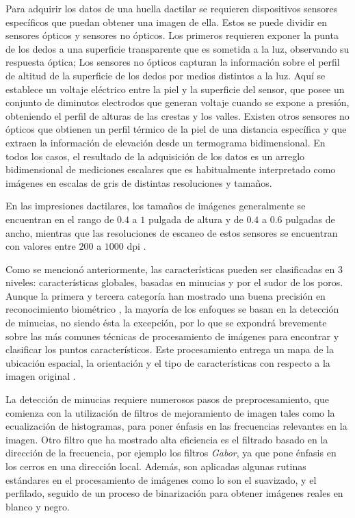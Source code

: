 Para adquirir los datos de una huella dactilar se requieren dispositivos sensores específicos que puedan obtener una imagen de ella. Estos se puede dividir en sensores ópticos y sensores no ópticos. Los primeros requieren exponer la punta de los dedos a una superficie transparente que es sometida a la luz, observando su respuesta óptica; Los sensores no ópticos capturan la información sobre el perfil de altitud de la superficie de los dedos por medios distintos a la luz. Aquí se establece un voltaje eléctrico entre la piel y la superficie del sensor, que posee un conjunto de diminutos electrodos que generan voltaje cuando se expone a presión, obteniendo el perfil de alturas de las crestas y los valles. Existen otros sensores no ópticos que obtienen un perfil térmico de la piel de una distancia específica y que extraen la información de elevación desde un termograma bidimensional. En todos los casos, el resultado de la adquisición de los datos es un arreglo bidimensional de mediciones escalares que es habitualmente interpretado como imágenes en escalas de gris de distintas resoluciones y tamaños.

En las impresiones dactilares, los tamaños de imágenes generalmente se encuentran en el rango de $0.4$ a $1$ pulgada de altura y de $0.4$ a $0.6$ pulgadas de ancho, mientras que las resoluciones de escaneo de estos sensores se encuentran con valores entre $200$ a $1000$ dpi \cite{Mal03}.


Como se mencionó anteriormente, las características pueden ser clasificadas en 3 niveles: características globales, basadas en minucias y por el sudor de los poros. Aunque la primera y tercera categoría han mostrado una buena precisión en reconocimiento biométrico \cite{Bal97}, la mayoría de los enfoques se basan en la detección de minucias, no siendo ésta la excepción, por lo que se expondrá brevemente sobre las más comunes técnicas de procesamiento de imágenes para encontrar y clasificar los puntos característicos. Este procesamiento entrega un mapa de la ubicación espacial, la orientación y el tipo de características con respecto a la imagen original \cite{Rod97}.


La detección de minucias requiere numerosos pasos de preprocesamiento, que comienza con la utilización de filtros de mejoramiento de imagen tales como la ecualización de histogramas, para poner énfasis en las frecuencias relevantes en la imagen. Otro filtro que ha mostrado alta eficiencia es el filtrado basado en la dirección de la frecuencia, por ejemplo los filtros \emph{Gabor}, ya que pone énfasis en los cerros en una dirección local. Además, son aplicadas algunas rutinas estándares en el procesamiento de imágenes como lo son el suavizado, y el perfilado, seguido de un proceso de binarización para obtener imágenes reales en blanco y negro.


